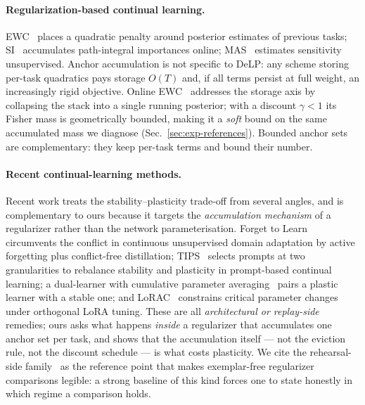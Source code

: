 \documentclass[review,11pt,number]{elsarticle}
\newcommand{\delp}{DeLP}
\begin{document}
\begin{sloppypar}
\paragraph{Regularization-based continual learning.}
EWC~\cite{kirkpatrick2017} places a quadratic penalty around posterior
estimates of previous tasks; SI~\cite{zenke2017} accumulates
path-integral importances online; MAS~\cite{aljundi2018} estimates
sensitivity unsupervised. Anchor accumulation is not specific to
\delp{}: any scheme storing per-task quadratics pays storage $O(T)$ and,
if all terms persist at full weight, an increasingly rigid objective.
Online EWC~\cite{chaudhry2018} addresses the storage axis by collapsing
the stack into a single running posterior; with a discount $\gamma{<}1$
its Fisher mass is geometrically bounded, making it a \emph{soft} bound
on the same accumulated mass we diagnose (Sec.~\ref{sec:exp-references}).
Bounded anchor sets are complementary: they keep per-task terms and
bound their number.

\paragraph{Recent continual-learning methods.}
Recent work treats the stability--plasticity trade-off from several
angles, and is complementary to ours because it targets the
\emph{accumulation mechanism} of a regularizer rather than the network
parameterisation. Forget to Learn~\cite{hassan2025f2l} circumvents the
conflict in continuous unsupervised domain adaptation by active
forgetting plus conflict-free distillation; {TIPS}~\cite{feng2026tips}
selects prompts at two granularities to rebalance stability and
plasticity in prompt-based continual learning; a dual-learner with
cumulative parameter averaging~\cite{sun2026dlcpa} pairs a plastic
learner with a stable one; and {LoRAC}~\cite{ling2026lorac} constrains
critical parameter changes under orthogonal {LoRA} tuning. These are all
\emph{architectural or replay-side} remedies; ours asks what happens
\emph{inside} a regularizer that accumulates one anchor set per task,
and shows that the accumulation itself --- not the eviction rule, not
the discount schedule --- is what costs plasticity. We cite the
rehearsal-side family~\cite{buzzega2020der} as the reference point that
makes exemplar-free regularizer comparisons legible: a strong baseline
of this kind forces one to state honestly in which regime a comparison
holds.
\end{sloppypar}
\end{document}
